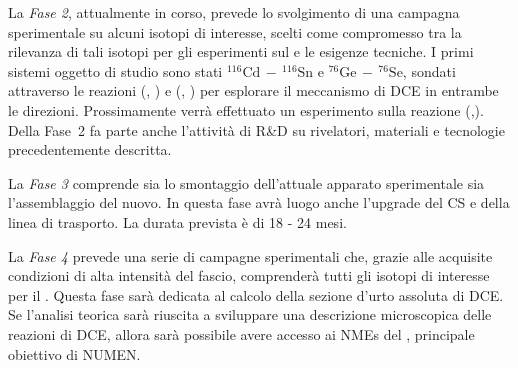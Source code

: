 La \emph{Fase 2}, attualmente in corso, prevede lo svolgimento di una campagna sperimentale su alcuni isotopi di interesse, scelti come compromesso tra la rilevanza di tali isotopi per gli esperimenti sul \doppiobeta{} e le esigenze tecniche. I primi sistemi oggetto di studio sono stati $^{116}\mbox{Cd}\,  - \, ^{116}\mbox{Sn} $ e $^{76}\mbox{Ge}\,  - \, ^{76}\mbox{Se} $, sondati attraverso le reazioni (, ) e (, ) per esplorare il meccanismo di DCE in entrambe le direzioni. Prossimamente verrà effettuato un esperimento sulla reazione (,). 
Della Fase~2 fa parte anche l'attività di R\&D su rivelatori, materiali e tecnologie precedentemente descritta.

La \emph{Fase 3} comprende sia lo smontaggio dell'attuale apparato sperimentale sia l'assemblaggio del nuovo. In questa fase avrà luogo anche l'upgrade del CS e della linea di trasporto. La durata prevista è di 18 - 24 mesi.


La \emph{Fase 4} prevede una serie di campagne sperimentali che, grazie alle acquisite condizioni di alta intensità del fascio, comprenderà tutti gli isotopi di interesse per il \doppiobeta{}. 
Questa fase sarà dedicata al calcolo della sezione d'urto assoluta di DCE. Se l'analisi teorica sarà riuscita a sviluppare una descrizione microscopica delle reazioni di DCE, allora sarà possibile avere accesso ai NMEs del \doppiobeta{}, principale obiettivo di NUMEN.










\clearpage
